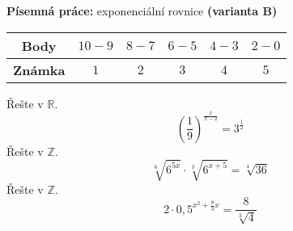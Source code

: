 \begin{center}
\large \textbf{Písemná práce:} exponenciální rovnice \textbf{(varianta B)}

\normalsize
{}\qquad
{}\qquad
{}
\end{center}
\begin{table}[h]
\centering
\begin{tabular}{c|c|c|c|c|c}
    \textbf{Body}   & $10-9$ & $8-7$ & $6-5$ & $4-3$ & $2-0$ \\ \hline
    \textbf{Známka} & $1$     & $2$   & $3 $  & $4$   & $5$
\end{tabular}
\end{table}

\noindent
\begin{questions}
    \bracketedpoints
    \question[3] Řešte v $\mathbb{R}$. $$\left(\dfrac{1}{9}\right)^{\frac{x}{x-2}} = 3^{\frac{1}{2}}$$
    \question[3] Řešte v $\mathbb{Z}$. $$\sqrt[6]{6^{5x}} \cdot \sqrt[3]{6^{x+5}} = \sqrt[4]{36}$$
    \question[4] Řešte v $\mathbb{Z}$. $$2\cdot0,5^{x^2+\frac{8}{3}x}=\frac{8}{\sqrt[3]{4}}$$
\end{questions}
\newpage

